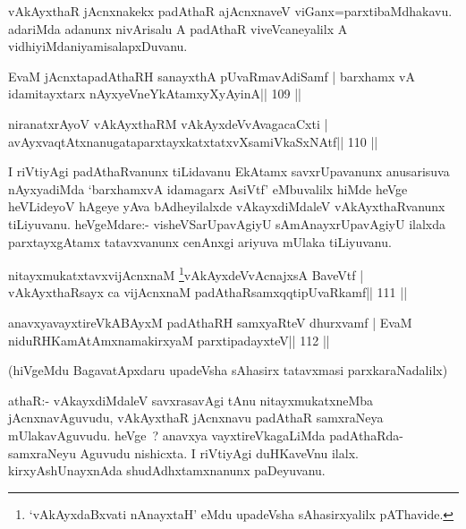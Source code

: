 \begin{artha}
vAkAyxthaR jAcnxnakekx padAthaR ajAcnxnaveV viGanx=parxtibaMdhakavu. adariMda adanunx nivArisalu A padAthaR viveVcaneyalilx A vidhiyiMda\break niyamisalapxDuvanu.
\end{artha}

\begin{shl}
EvaM jAcnxtapadAthaRH sanayxthA pUvaRmavAdiSamf |
barxhamx vA idamitayxtarx nAyxyeVneYkAtamxyXyAyinA\hfill || 109 ||
\end{shl}

\begin{shl}
niranatxrAyoV vAkAyxthaRM vAkAyxdeVvAvagacaCxti |
avAyxvaqtAtxnanugataparxtayxkatxtatxvXsamiVkaSxNAtf\hfill || 110 ||
\end{shl}

\begin{artha}
I riVtiyAgi padAthaRvanunx tiLidavanu EkAtamx savxrUpavanunx anusarisuva nAyxyadiMda `barxhamxvA idamagarx AsiVtf' eMbuvalilx hiMde heVge heVLideyoV hAgeye yAva bAdheyilalxde vAkayxdiMdaleV vAkAyxthaRvanunx tiLiyuvanu. heVgeMdare:- visheVSarUpavAgiyU sAmAnayxrUpavAgiyU ilalxda parxtayxgAtamx tatavxvanunx cenAnxgi ariyuva mUlaka tiLiyuvanu.
\end{artha}


\begin{shl}
nitayxmukatxtavxvijAcnxnaM \footnote{`vAkAyxdaBxvati nAnayxtaH' eMdu upadeVsha sAhasirxyalilx pAThavide.}vAkAyxdeVvAcnajxsA BaveVtf |
vAkAyxthaRsayx ca vijAcnxnaM padAthaRsamxqqtipUvaRkamf\hfill || 111 ||
\end{shl}

\begin{shl}
anavxyavayxtireVkABAyxM padAthaRH samxyaRteV dhurxvamf |
EvaM niduRHKamAtAmxnamakirxyaM parxtipadayxteV\hfill || 112 ||
\end{shl}

\begin{artha}
(hiVgeMdu BagavatApxdaru upadeVsha sAhasirx tatavxmasi parxkaraNadalilx) 
\end{artha}

\begin{artha}
athaR:- vAkayxdiMdaleV savxrasavAgi tAnu nitayxmukatxneMba jAcnxnavAguvudu, vAkAyxthaR jAcnxnavu padAthaR samxraNeya mUlakavAguvudu. heVge~? anavxya vayxtireVkagaLiMda padAthaRda-samxraNeyu Aguvudu nishicxta. I riVtiyAgi duHKaveVnu ilalx. kirxyAshUnayxnAda shudAdhxtamxnanunx paDeyuvanu.
\end{artha}

